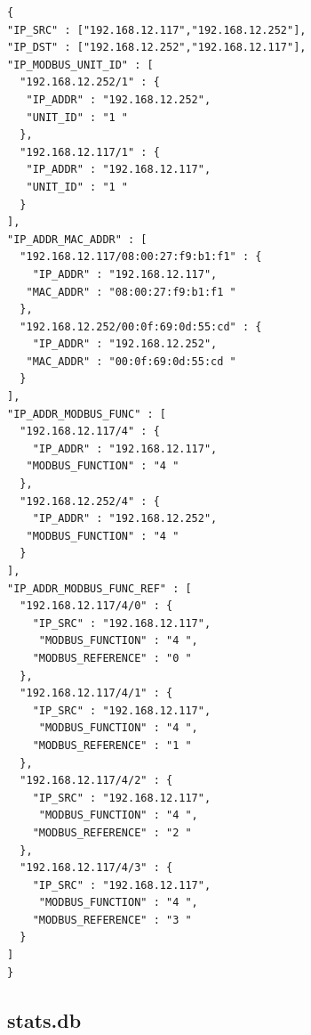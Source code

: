 \documentclass[12pt,]{article}
\begin{document}
\begin{verbatim}
{
"IP_SRC" : ["192.168.12.117","192.168.12.252"],
"IP_DST" : ["192.168.12.252","192.168.12.117"],
"IP_MODBUS_UNIT_ID" : [
  "192.168.12.252/1" : {
   "IP_ADDR" : "192.168.12.252",
   "UNIT_ID" : "1 "
  },
  "192.168.12.117/1" : {
   "IP_ADDR" : "192.168.12.117",
   "UNIT_ID" : "1 "
  }
],
"IP_ADDR_MAC_ADDR" : [
  "192.168.12.117/08:00:27:f9:b1:f1" : {
    "IP_ADDR" : "192.168.12.117",
   "MAC_ADDR" : "08:00:27:f9:b1:f1 "
  },
  "192.168.12.252/00:0f:69:0d:55:cd" : {
    "IP_ADDR" : "192.168.12.252",
   "MAC_ADDR" : "00:0f:69:0d:55:cd "
  }
],
"IP_ADDR_MODBUS_FUNC" : [
  "192.168.12.117/4" : {
    "IP_ADDR" : "192.168.12.117",
   "MODBUS_FUNCTION" : "4 "
  },
  "192.168.12.252/4" : {
    "IP_ADDR" : "192.168.12.252",
   "MODBUS_FUNCTION" : "4 "
  }
],
"IP_ADDR_MODBUS_FUNC_REF" : [
  "192.168.12.117/4/0" : {
    "IP_SRC" : "192.168.12.117",
     "MODBUS_FUNCTION" : "4 ",
    "MODBUS_REFERENCE" : "0 "
  },
  "192.168.12.117/4/1" : {
    "IP_SRC" : "192.168.12.117",
     "MODBUS_FUNCTION" : "4 ",
    "MODBUS_REFERENCE" : "1 "
  },
  "192.168.12.117/4/2" : {
    "IP_SRC" : "192.168.12.117",
     "MODBUS_FUNCTION" : "4 ",
    "MODBUS_REFERENCE" : "2 "
  },
  "192.168.12.117/4/3" : {
    "IP_SRC" : "192.168.12.117",
     "MODBUS_FUNCTION" : "4 ",
    "MODBUS_REFERENCE" : "3 "
  }
]
}
\end{verbatim}

\pagebreak

\subsection{stats.db}\label{stats.db}
\end{document}
